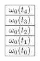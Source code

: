 \documentclass[preview]{standalone}
\begin{document}
$$ \begin{array}{|c|}
	\hline
	\omega_0(t_4)\\
	\hline
	\omega_0(t_3)\\
	\hline
	\omega_0(t_2)\\
	\hline
	\omega_0(t_1)\\
	\hline
	\omega_0(t_0)\\
	\hline
\end{array}
 $$
\end{document}
